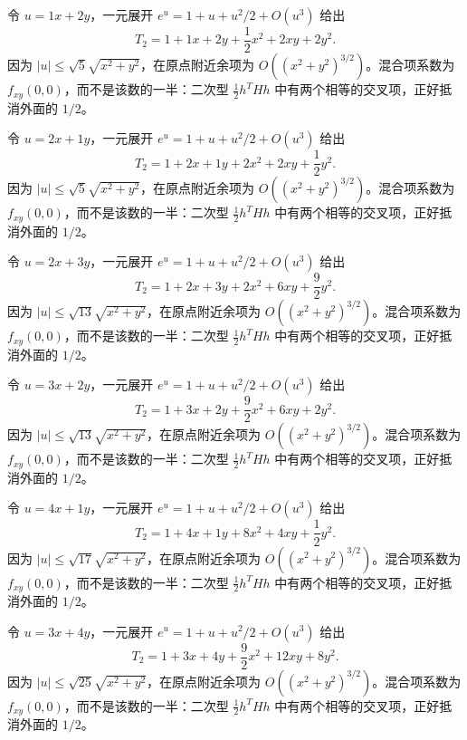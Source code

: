 \documentclass[UTF8,12pt,a4paper,fontset=fandol]{ctexart}
\begin{document}
\begin{solve}\label{ans:c33q19}
令 $u=1x+2y$，一元展开 $e^u=1+u+u^2/2+O(u^3)$ 给出
\[
T_2=1+1x+2y+\frac{1}{2}x^2+2xy+2y^2.
\]
因为 $|u|\le\sqrt{5}\sqrt{x^2+y^2}$，在原点附近余项为 $O((x^2+y^2)^{3/2})$。混合项系数为 $f_{xy}(0,0)$，而不是该数的一半：二次型 $\frac12h^THh$ 中有两个相等的交叉项，正好抵消外面的 $1/2$。
\end{solve}

\begin{solve}\label{ans:c33q20}
令 $u=2x+1y$，一元展开 $e^u=1+u+u^2/2+O(u^3)$ 给出
\[
T_2=1+2x+1y+2x^2+2xy+\frac{1}{2}y^2.
\]
因为 $|u|\le\sqrt{5}\sqrt{x^2+y^2}$，在原点附近余项为 $O((x^2+y^2)^{3/2})$。混合项系数为 $f_{xy}(0,0)$，而不是该数的一半：二次型 $\frac12h^THh$ 中有两个相等的交叉项，正好抵消外面的 $1/2$。
\end{solve}

\begin{solve}\label{ans:c33q21}
令 $u=2x+3y$，一元展开 $e^u=1+u+u^2/2+O(u^3)$ 给出
\[
T_2=1+2x+3y+2x^2+6xy+\frac{9}{2}y^2.
\]
因为 $|u|\le\sqrt{13}\sqrt{x^2+y^2}$，在原点附近余项为 $O((x^2+y^2)^{3/2})$。混合项系数为 $f_{xy}(0,0)$，而不是该数的一半：二次型 $\frac12h^THh$ 中有两个相等的交叉项，正好抵消外面的 $1/2$。
\end{solve}

\begin{solve}\label{ans:c33q22}
令 $u=3x+2y$，一元展开 $e^u=1+u+u^2/2+O(u^3)$ 给出
\[
T_2=1+3x+2y+\frac{9}{2}x^2+6xy+2y^2.
\]
因为 $|u|\le\sqrt{13}\sqrt{x^2+y^2}$，在原点附近余项为 $O((x^2+y^2)^{3/2})$。混合项系数为 $f_{xy}(0,0)$，而不是该数的一半：二次型 $\frac12h^THh$ 中有两个相等的交叉项，正好抵消外面的 $1/2$。
\end{solve}

\begin{solve}\label{ans:c33q23}
令 $u=4x+1y$，一元展开 $e^u=1+u+u^2/2+O(u^3)$ 给出
\[
T_2=1+4x+1y+8x^2+4xy+\frac{1}{2}y^2.
\]
因为 $|u|\le\sqrt{17}\sqrt{x^2+y^2}$，在原点附近余项为 $O((x^2+y^2)^{3/2})$。混合项系数为 $f_{xy}(0,0)$，而不是该数的一半：二次型 $\frac12h^THh$ 中有两个相等的交叉项，正好抵消外面的 $1/2$。
\end{solve}

\begin{solve}\label{ans:c33q24}
令 $u=3x+4y$，一元展开 $e^u=1+u+u^2/2+O(u^3)$ 给出
\[
T_2=1+3x+4y+\frac{9}{2}x^2+12xy+8y^2.
\]
因为 $|u|\le\sqrt{25}\sqrt{x^2+y^2}$，在原点附近余项为 $O((x^2+y^2)^{3/2})$。混合项系数为 $f_{xy}(0,0)$，而不是该数的一半：二次型 $\frac12h^THh$ 中有两个相等的交叉项，正好抵消外面的 $1/2$。
\end{solve}
\end{document}
